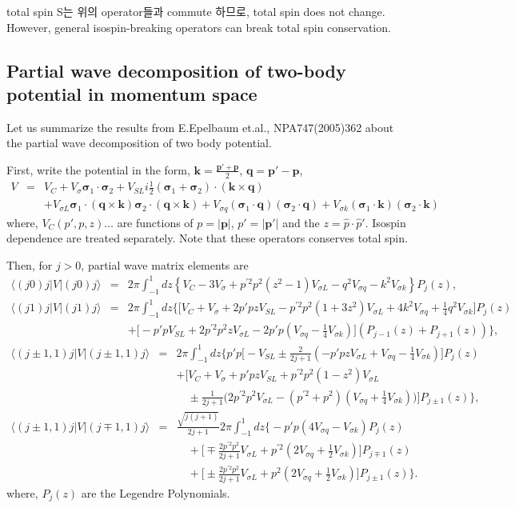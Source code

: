 \documentclass[10pt]{book}
\def\bm{\boldsymbol}
\newcommand{\bea}{\begin{eqnarray}}
\newcommand{\eea}{\end{eqnarray}}
\newcommand{\no}{\nonumber \\}
\def\vs{{\bm \sigma}}
\def\vp{{\bm p}}
\def\vq{{\bm q}}
\def\vk{{\bm k}}
\def\la{\langle}
\def\ra{\rangle}
\begin{document}
total spin S는 위의 operator들과 commute 하므로,  total spin does not change. However, general isospin-breaking operators
can break total spin conservation.

\subsection{Partial wave decomposition of two-body 
potential in momentum space}
Let us summarize the results from E.Epelbaum et.al., NPA747(2005)362
about the partial wave decomposition of two body potential.

First, write the potential in the form,
$\vk=\frac{\vp'+\vp}{2}$, $\vq=\vp'-\vp$,
\bea
V&=&V_C+V_\sigma\vs_1\cdot\vs_2
   +V_{SL} i\frac{1}{2}(\vs_1+\vs_2)\cdot(\vk\times\vq)
   \no & &
   +V_{\sigma L}\vs_1\cdot(\vq\times\vk)\vs_2\cdot(\vq\times\vk)
   +V_{\sigma q}(\vs_1\cdot\vq)(\vs_2\cdot\vq)
   +V_{\sigma k}(\vs_1\cdot\vk)(\vs_2\cdot\vk)
\eea
where, $V_C(p',p,z)\dots$ are functions of
$p=|\vp|$, $p'=|\vp'|$ and the $z=\hat{p}\cdot\hat{p}'$.
Isospin dependence are treated separately.
Note that these operators conserves total spin.

Then, for $j>0$, partial wave matrix elements are
\bea
\la (j 0) j|V|(j0)j\ra
&=& 2\pi \int_{-1}^{1}dz \left\{ 
 V_C-3 V_\sigma+ p^{'2}p^2(z^2-1)V_{\sigma L}
  -q^2 V_{\sigma q}-k^2 V_{\sigma k} 
\right\} P_j(z),\no 
\la (j1)j|V|(j1)j\ra
&=&2\pi\int_{-1}^{1}dz \Big\{ \Big[
  V_C+V_\sigma+2 p' p z V_{SL}
  -p^{'2}p^2(1+3z^2)V_{\sigma L}
  +4 k^2 V_{\sigma q}+\frac{1}{4}q^2 V_{\sigma k}
  \Big]  P_j(z)   \no & &
 +\Big[-p' p V_{SL}+2 p^{'2}p^2 z V_{\sigma L}
  -2 p' p(V_{\sigma q}-\frac{1}{4}V_{\sigma k}  )   
 \Big](P_{j-1}(z)+P_{j+1}(z))
\Big\},
\eea 
\bea
\la (j\pm 1,1)j|V|(j\pm 1,1) j\ra
&=& 2\pi \int_{-1}^1 dz \Big\{ 
    p' p \Big[ -V_{SL}
    \pm \frac{2}{2j+1}\left(-p'p z V_{\sigma L}
    +V_{\sigma q}-\frac{1}{4} V_{\sigma k}\right)\Big]P_j(z)
    \no & &
    +\Big[
     V_C+V_\sigma+p'pz V_{SL}+p^{'2}p^2(1-z^2)V_{\sigma L}
     \no & &\quad
     \pm\frac{1}{2j+1}
     \Big(2 p^{'2}p^2 V_{\sigma L}
     -(p^{'2}+p^2)\left(V_{\sigma q}+\frac{1}{4}V_{\sigma k}\right)
     \Big)
     \Big]P_{j\pm 1}(z)    
\Big\},\no
\la (j\pm 1,1)j|V|(j\mp 1,1)j\ra
&=&\frac{\sqrt{j(j+1)}}{2j+1} 2\pi\int_{-1}^1 dz\Big\{
    -p' p(4 V_{\sigma q}-V_{\sigma k})P_j(z) \no & &\quad
    +\Big[ \mp\frac{2 p^{'2}p^2}{2j+1}V_{\sigma L}
           +p^{'2}\left(2 V_{\sigma q}+\frac{1}{2}V_{\sigma k}\right)
    \Big] P_{j\mp 1}(z)\no & &\quad
   +\Big[\pm\frac{2 p^{'2}p^2}{2j+1}V_{\sigma L}
              +p^{2}\left(2 V_{\sigma q}+\frac{1}{2}V_{\sigma k}\right)
       \Big] P_{j\pm 1}(z)
\Big\}.
\eea
where, $P_j(z)$ are the Legendre Polynomials.
\end{document}
